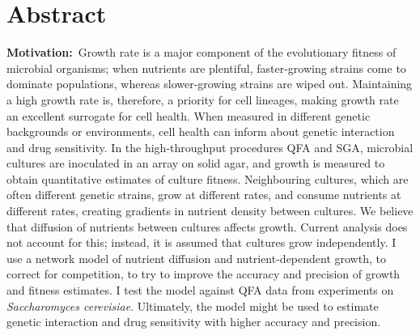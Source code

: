\section*{Abstract}
\label{sec:abstract}


\textbf{Motivation:}~Growth rate is a major component of the
evolutionary fitness of microbial organisms; when nutrients are
plentiful, faster-growing strains come to dominate populations,
whereas slower-growing strains are wiped out. Maintaining a high
growth rate is, therefore, a priority for cell lineages, making growth
rate an excellent surrogate for cell health. When measured in
different genetic backgrounds or environments, cell health can inform
about genetic interaction and drug sensitivity. In the high-throughput
procedures QFA and SGA, microbial cultures are inoculated in an array
on solid agar, and growth is measured to obtain quantitative estimates
of culture fitness. Neighbouring cultures, which are often different
genetic strains, grow at different rates, and consume nutrients at
different rates, creating gradients in nutrient density between
cultures. We believe that diffusion of nutrients between cultures
affects growth. Current analysis does not account for this; instead,
it is assumed that cultures grow independently. I use a network model
of nutrient diffusion and nutrient-dependent growth, to correct for
competition, to try to improve the accuracy and precision of growth
and fitness estimates. I test the model against QFA data from
experiments on \textit{Saccharomyces cerevisiae}. Ultimately, the
model might be used to estimate genetic interaction and drug
sensitivity with higher accuracy and precision.
\\
